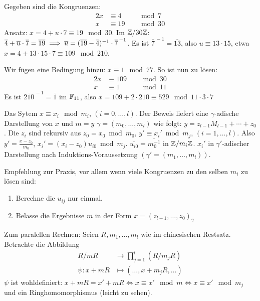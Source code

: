 \documentclass[a4paper,twoside,DIV15,BCOR12mm]{scrbook}
\begin{document}
\begin{beispiel}
Gegeben sind die Kongruenzen:
\begin{alignat*}{2}
    x &\equiv 4 &&\mod 7\\
    x &\equiv 19 &&\mod 30
\end{alignat*}
Ansatz: $x=4 + u\cdot 7 \equiv 19 \mod 30$. Im $\mathbb{Z}/30\mathbb{Z}$:
$\overline 4 + \overline u\cdot \overline 7  = \overline {19} \implies
\overline u = (\overline {19} - \overline 4)^{-1} \cdot \overline
7^{\,-1}$. Es ist $\overline 7^{\,-1}=\overline {13}$, also $u
\equiv 13\cdot 15$, etwa $x = 4 + 13 \cdot 15  \cdot 7 \equiv 109
\mod 210$.

Wir fügen eine Bedingung hinzu: $x\equiv 1 \mod 77$. So ist nun zu
lösen:
\begin{alignat*}{2}
    x &\equiv 109 &&\mod 30\\
    x &\equiv 1 &&\mod 11
\end{alignat*}
Es ist $\overline {210}^{\,-1} = \overline 1$ im $\mathbb{F}_{11}$, also
$x=109+2\cdot 210 \equiv 529 \mod 11\cdot3\cdot 7$
\end{beispiel}

\begin{bemerkung}[zur Praxis]
Das Sytem $x\equiv x_i \mod m_i$, $(i=0,\ldots,l)$. Der Beweis
liefert eine $\gamma$-adische Darstellung von $x$ und $m=y$
$\gamma=(m_0,\ldots,m_l)$ wie folgt: $y = z_{l-1}M_{l-1}+\cdots+
z_0$. Die $z_i$ sind rekursiv aus $z_0 = x_0 \bmod m_0$, $y' \equiv
x_i' \bmod m_j$, $(i=1,\ldots,l)$. Also $y'=\frac{x-z_0}{m_0}$,
$x_i' = (x_i - z_0)u_{i0} \bmod m_j$. $\overline {u_{i0}} =
\overline {m_0^{-1}}$ in $\mathbb{Z}/m_i\mathbb{Z}$. $x_i'$ in
$\gamma'$-adischer Darstellung nach Induktions-Voraussetzung
$(\gamma'=(m_1,\ldots,m_l))$.

Empfehlung zur Praxis, vor allem wenn viele Kongruenzen zu den
selben $m_i$ zu lösen sind:
\begin{enumerate}
\item Berechne die $u_{ij}$ nur einmal.
\item Belasse die Ergebnisse $m$ in der Form $x=(z_{l-1},\ldots,z_0)_\gamma$
\end{enumerate}
\end{bemerkung}

Zum paralellen Rechnen: Seien $R,m_1,\ldots,m_l$ wie im chinesischen
Restsatz. Betrachte  die Abbildung
\begin{align*}
R/mR &\to \prod_{j=1}^l (R/m_jR) \\
\psi: x + mR &\mapsto (\ldots, x + m_jR, \ldots )
\end{align*}
$\psi$ ist wohldefiniert: $x+mR = x'+mR \iff x \equiv x' \mod m \iff
x \equiv x' \mod m_j$ und ein Ringhomomorphismus (leicht zu sehen).
\end{document}
